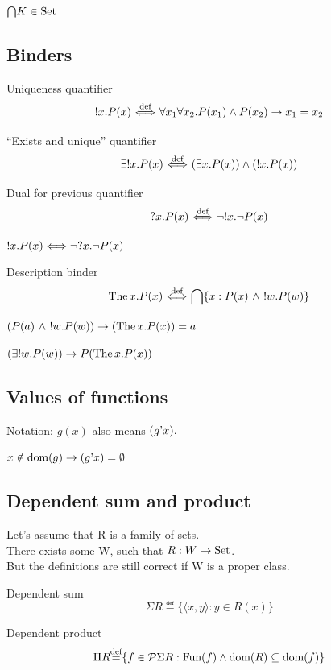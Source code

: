 \documentclass[10pt,a4paper]{article}
\begin{document}
\begin{exercise}
${\bigcap} K \in {\textrm{Set}}$
\end{exercise}
\subsection{Binders}
\begin{definition} Uniqueness quantifier
$$!x. P(x) {\stackrel{{\textrm{def}}}{\ \Longleftrightarrow\ }} \forall x_1 \forall x_2. P(x_1)\land P(x_2)\to x_1=x_2$$
\end{definition}

\begin{definition} ``Exists and unique'' quantifier
$$\exists !x. P(x) {\stackrel{{\textrm{def}}}{\ \Longleftrightarrow\ }} (\exists x. P(x))\land(!x. P(x))$$
\end{definition}

\begin{definition}  Dual for previous quantifier 
$$?x. P(x) {\stackrel{{\textrm{def}}}{\ \Longleftrightarrow\ }} \neg !x. \neg P(x)$$
\end{definition}

\begin{exercise}
$!x. P(x) \Longleftrightarrow \neg ?x. \neg P(x)$
\end{exercise}

\begin{definition} Description binder
$${\textrm{The\,}} x. P(x) {\stackrel{{\textrm{def}}}{\ \Longleftrightarrow\ }} {\bigcap} \{x:P(x)\ \land\ !w.P(w)\}$$
\end{definition}

\begin{exercise}
$(P(a)\ \land\ !w.P(w)) \rightarrow ({\textrm{The\,}} x. P(x))=a$
\end{exercise}

\begin{exercise}
$(\exists !w.P(w)) \rightarrow P({\textrm{The\,}} x. P(x))$
\end{exercise}

\subsection{Values of functions}
Notation: $g(x)$ also means $(g{\textrm{'}} x).$\\

\begin{exercise}
$x\notin {\textrm{dom}}(g)\to (g{\textrm{'}} x)=\emptyset$
\end{exercise}

\subsection{Dependent sum and product}
Let's assume that R is a family of sets.\\
There exists some W, such that $R:W\to{\textrm{Set}}$.\\
But the definitions are still correct if W is a proper class.\\
\begin{definition} Dependent sum
$$\Sigma R\eqdef\{\langle x, y\rangle: y\in R(x)\}$$
\end{definition}
\begin{definition} Dependent product
$$\Pi R{\stackrel{{\textrm{def}}}{=}}\{ f\in {\mathcal{P}}\Sigma R: {\textrm{Fun}}(f)\land {\textrm{dom}}(R)\subseteq {\textrm{dom}}(f)\}$$
\end{definition}
\end{document}

